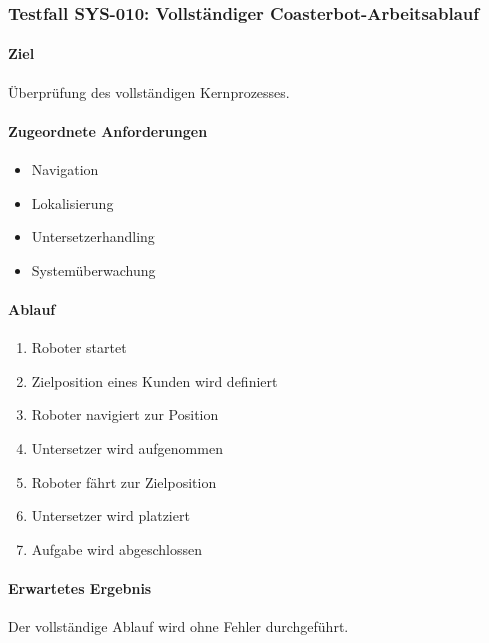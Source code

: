 \subsubsection{Testfall SYS-010: Vollständiger
Coasterbot-Arbeitsablauf}\label{testfall-sys-010-vollstuxe4ndiger-coasterbot-arbeitsablauf}

\paragraph{Ziel}\label{ziel-33}

Überprüfung des vollständigen Kernprozesses.

\paragraph{Zugeordnete
Anforderungen}\label{zugeordnete-anforderungen-33}

\begin{itemize}
\tightlist
\item
  Navigation
\item
  Lokalisierung
\item
  Untersetzerhandling
\item
  Systemüberwachung
\end{itemize}

\paragraph{Ablauf}\label{ablauf-33}

\begin{enumerate}
\def\labelenumi{\arabic{enumi}.}
\tightlist
\item
  Roboter startet
\item
  Zielposition eines Kunden wird definiert
\item
  Roboter navigiert zur Position
\item
  Untersetzer wird aufgenommen
\item
  Roboter fährt zur Zielposition
\item
  Untersetzer wird platziert
\item
  Aufgabe wird abgeschlossen
\end{enumerate}

\paragraph{Erwartetes Ergebnis}\label{erwartetes-ergebnis-33}

Der vollständige Ablauf wird ohne Fehler durchgeführt.

